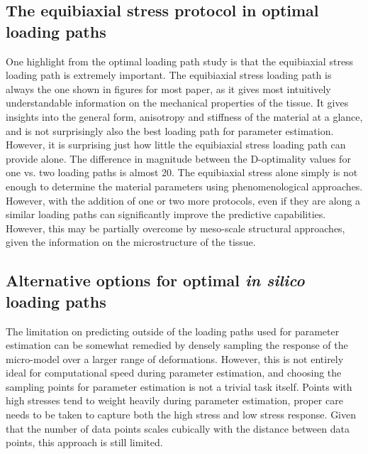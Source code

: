     
    
    
\subsection{The equibiaxial stress protocol in optimal loading paths}

    One highlight from the optimal loading path study is that the equibiaxial stress loading path is extremely important. The equibiaxial stress loading path is always the one shown in figures for most paper, as it gives most intuitively understandable information on the mechanical properties of the tissue. It gives insights into the general form, anisotropy and stiffness of the material at a glance, and is not surprisingly also the best loading path for parameter estimation. However, it is surprising just how little the equibiaxial stress loading path can provide alone. The difference in magnitude between the D-optimality values for one vs. two loading paths is almost 20. The equibiaxial stress alone simply is not enough to determine the material parameters using phenomenological approaches. However, with the addition of one or two more protocols, even if they are along a similar loading paths can significantly improve the predictive capabilities. However, this may be partially overcome by meso-scale structural approaches, given the information on the microstructure of the tissue.


\subsection{Alternative options for optimal \textit{in silico} loading paths}

	The limitation on predicting outside of the loading paths used for parameter estimation can be somewhat remedied by densely sampling the response of the micro-model over a larger range of deformations. However, this is not entirely ideal for computational speed during parameter estimation, and choosing the sampling points for parameter estimation is not a trivial task itself. Points with high stresses tend to weight heavily during parameter estimation, proper care needs to be taken to capture both the high stress and low stress response. Given that the number of data points scales cubically with the distance between data points, this approach is still limited. 

